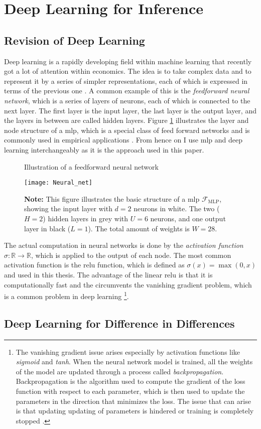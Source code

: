 \section{Deep Learning for Inference}

\subsection{Revision of Deep Learning}
Deep learning is a rapidly developing field within machine learning that recently got a lot of attention within economics.
The idea is to take complex data and to represent it by a series of simpler representations, each of which is expressed in terms of the previous one \citep{Goodfellow-et-al-2016}.
A common example of this is the \textit{feedforward neural network}, which is a series of layers of neurons, each of which is connected to the next layer.
The first layer is the input layer, the last layer is the output layer, and the layers in between are called hidden layers.
Figure \ref{fig:1} illustrates the layer and node structure of a \ac{mlp}, which is a special class of feed forward networks and is commonly used in empirical applications \citep{farrellDeepNeuralNetworks2021}.
From hence on I use \ac{mlp} and deep learning interchangeably as it is the approach used in this paper.

\begin{figure}%
\centering
\caption{Illustration of a feedforward neural network \citep{farrellDeepNeuralNetworks2021}}
\texttt{[image: Neural\_net]}
\caption*{\textbf{Note:} This figure illustrates the basic structure of a \ac{mlp} $\mathcal{F}_{\text{MLP}}$, showing the input layer with $d=2$ neurons in white. The two ($H=2$) hidden layers in grey with $U=6$ neurons, and one output layer in black ($L=1$). The total amount of weights is $W=28$.}
\label{fig:1}
\end{figure}


The actual computation in neural networks is done by the \textit{activation function} $ \sigma : \mathbb{R} \to \mathbb{R} $, which is applied to the output of each node.
The most common activation function is the \ac{relu} function, which is defined as $ \sigma(x) = \max(0, x) $ and used in this thesis.
The advantage of the linear \ac{relu} is that it is computationally fast and the circumvents the vanishing gradient problem, which is a common problem in deep learning
\footnote[1]{The vanishing gradient issue arises especially by activation functions like \textit{sigmoid} and \textit{tanh}.
When the neural network model is trained, all the weights of the model are updated through a process called \textit{backpropagation}.
Backpropagation is the algorithm used to compute the gradient of the loss function with respect to each parameter, which is then used to update the parameters in the direction that minimizes the loss.
The issue that can arise is that updating updating of parameters is hindered or training is completely stopped \citep{abuqaddom2021oriented}.}.


\subsection{Deep Learning for Difference in Differences}
